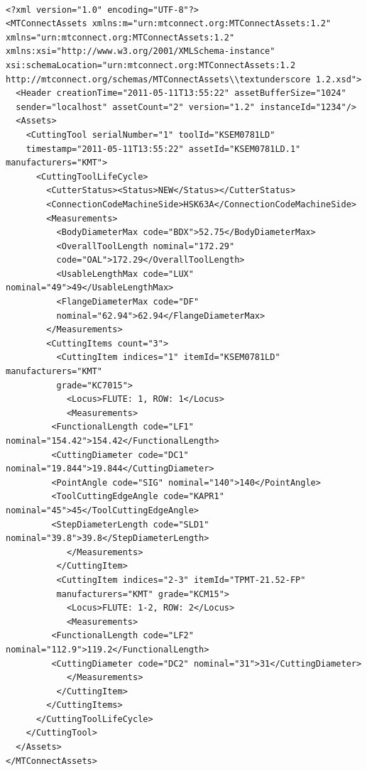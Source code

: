 	\begin{lstlisting}[firstnumber=1,escapechar=|,% 
	caption={Example for Step Drill with Explicate Loci}, label={lst:Example for Step Drill with Explicate Loci}]
	
<?xml version="1.0" encoding="UTF-8"?>
<MTConnectAssets xmlns:m="urn:mtconnect.org:MTConnectAssets:1.2" 
xmlns="urn:mtconnect.org:MTConnectAssets:1.2" 
xmlns:xsi="http://www.w3.org/2001/XMLSchema-instance" 
xsi:schemaLocation="urn:mtconnect.org:MTConnectAssets:1.2 
http://mtconnect.org/schemas/MTConnectAssets\\textunderscore 1.2.xsd">
  <Header creationTime="2011-05-11T13:55:22" assetBufferSize="1024" 
  sender="localhost" assetCount="2" version="1.2" instanceId="1234"/>
  <Assets>
    <CuttingTool serialNumber="1" toolId="KSEM0781LD" 
    timestamp="2011-05-11T13:55:22" assetId="KSEM0781LD.1" manufacturers="KMT">
      <CuttingToolLifeCycle>
        <CutterStatus><Status>NEW</Status></CutterStatus>
        <ConnectionCodeMachineSide>HSK63A</ConnectionCodeMachineSide>
        <Measurements>
          <BodyDiameterMax code="BDX">52.75</BodyDiameterMax>
          <OverallToolLength nominal="172.29" 
          code="OAL">172.29</OverallToolLength>
          <UsableLengthMax code="LUX" nominal="49">49</UsableLengthMax>
          <FlangeDiameterMax code="DF" 
          nominal="62.94">62.94</FlangeDiameterMax>
        </Measurements>
        <CuttingItems count="3">
          <CuttingItem indices="1" itemId="KSEM0781LD" manufacturers="KMT" 
          grade="KC7015">
            <Locus>FLUTE: 1, ROW: 1</Locus>
            <Measurements>
         <FunctionalLength code="LF1" nominal="154.42">154.42</FunctionalLength>
         <CuttingDiameter code="DC1" nominal="19.844">19.844</CuttingDiameter>
         <PointAngle code="SIG" nominal="140">140</PointAngle>
         <ToolCuttingEdgeAngle code="KAPR1" nominal="45">45</ToolCuttingEdgeAngle>
         <StepDiameterLength code="SLD1" nominal="39.8">39.8</StepDiameterLength>
            </Measurements>
          </CuttingItem>
          <CuttingItem indices="2-3" itemId="TPMT-21.52-FP" 
          manufacturers="KMT" grade="KCM15">
            <Locus>FLUTE: 1-2, ROW: 2</Locus>
            <Measurements>
         <FunctionalLength code="LF2" nominal="112.9">119.2</FunctionalLength>
         <CuttingDiameter code="DC2" nominal="31">31</CuttingDiameter>
            </Measurements>
          </CuttingItem>
        </CuttingItems>
      </CuttingToolLifeCycle>
    </CuttingTool>
  </Assets>
</MTConnectAssets>

	\end{lstlisting}


